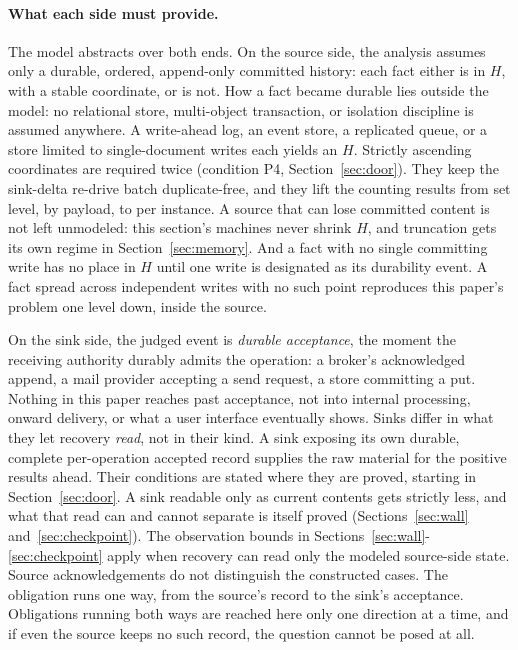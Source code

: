 \documentclass[sigplan,10pt]{acmart}
\theoremstyle{plain}
\theoremstyle{definition}
\begin{document}
\paragraph{What each side must provide.}
The model abstracts over both ends. On the source side,
the analysis assumes only a durable, ordered, append-only
committed history: each fact either is in $H$, with a stable
coordinate, or is not. How a fact became durable lies outside the
model: no relational store, multi-object transaction, or isolation
discipline is assumed anywhere. A write-ahead log, an event store, a
replicated queue, or a store limited to single-document writes each
yields an $H$. Strictly ascending coordinates are required twice
(condition P4, Section~\ref{sec:door}). They keep the sink-delta
re-drive batch duplicate-free, and they lift the counting results from
set level, by payload, to per instance. A source that can
lose committed content is not left unmodeled: this section's machines
never shrink $H$, and truncation gets its own regime in
Section~\ref{sec:memory}. And a fact with no single
committing write has no place in $H$ until one write is designated as
its durability event. A fact spread across independent writes with no
such point reproduces this paper's problem one level down, inside the
source.

On the sink side, the judged event is \emph{durable acceptance}, the
moment the receiving authority durably admits the operation: a
broker's acknowledged append, a mail provider accepting a send
request, a store committing a put. Nothing in this paper reaches past
acceptance, not into internal processing, onward delivery, or what a
user interface eventually shows. Sinks differ in what they let
recovery \emph{read}, not in their kind. A sink exposing its own
durable, complete per-operation accepted record supplies the raw
material for the positive results ahead. Their conditions are stated where
they are proved, starting in Section~\ref{sec:door}. A sink readable
only as current contents gets strictly less, and what that read can
and cannot separate is itself proved (Sections~\ref{sec:wall}
and~\ref{sec:checkpoint}). The observation bounds in
Sections~\ref{sec:wall}-\ref{sec:checkpoint} apply when recovery can
read only the modeled source-side state. Source acknowledgements do
not distinguish the constructed cases. The obligation runs one way, from the source's
record to the sink's acceptance. Obligations running both ways are reached here only one
direction at a time, and if even the source keeps no such record, the
question cannot be posed at all.
\end{document}
